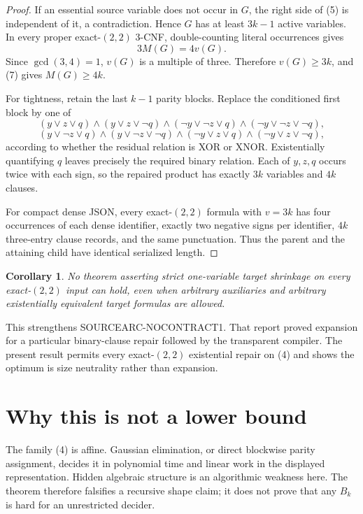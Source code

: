 \documentclass[11pt]{article}
\newtheorem{corollary}[theorem]{Corollary}
\begin{document}
\begin{proof}
If an essential source variable does not occur in $G$, the right side of
(5) is independent of it, a contradiction.  Hence $G$ has at least $3k-1$
active variables.  In every proper exact-$(2,2)$ 3-CNF, double-counting
literal occurrences gives
\[
                         3M(G)=4v(G).                      \tag{7}
\]
Since $\gcd(3,4)=1$, $v(G)$ is a multiple of three.  Therefore
$v(G)\ge3k$, and (7) gives $M(G)\ge4k$.

For tightness, retain the last $k-1$ parity blocks.  Replace the conditioned
first block by one of
\begin{equation}
 (y\vee z\vee q)\wedge(y\vee z\vee\neg q)\wedge
 (\neg y\vee\neg z\vee q)\wedge
 (\neg y\vee\neg z\vee\neg q),                         \tag{8}
\end{equation}
\begin{equation}
 (y\vee\neg z\vee q)\wedge(y\vee\neg z\vee\neg q)\wedge
 (\neg y\vee z\vee q)\wedge
 (\neg y\vee z\vee\neg q),                            \tag{9}
\end{equation}
according to whether the residual relation is XOR or XNOR.  Existentially
quantifying $q$ leaves precisely the required binary relation.  Each of
$y,z,q$ occurs twice with each sign, so the repaired product has exactly
$3k$ variables and $4k$ clauses.

For compact dense JSON, every exact-$(2,2)$ formula with $v=3k$ has four
occurrences of each dense identifier, exactly two negative signs per
identifier, $4k$ three-entry clause records, and the same punctuation.
Thus the parent and the attaining child have identical serialized length.
\end{proof}

\begin{corollary}
No theorem asserting strict one-variable target shrinkage on every
exact-$(2,2)$ input can hold, even when arbitrary auxiliaries and arbitrary
existentially equivalent target formulas are allowed.
\end{corollary}

This strengthens SOURCEARC-NOCONTRACT1.  That report proved expansion for a
particular binary-clause repair followed by the transparent compiler.  The
present result permits every exact-$(2,2)$ existential repair on (4) and
shows the optimum is size neutrality rather than expansion.

\section{Why this is not a lower bound}
The family (4) is affine.  Gaussian elimination, or direct blockwise parity
assignment, decides it in polynomial time and linear work in the displayed
representation.  Hidden algebraic structure is an algorithmic weakness here.
The theorem therefore falsifies a recursive shape claim; it does not prove
that any $B_k$ is hard for an unrestricted decider.
\end{document}
